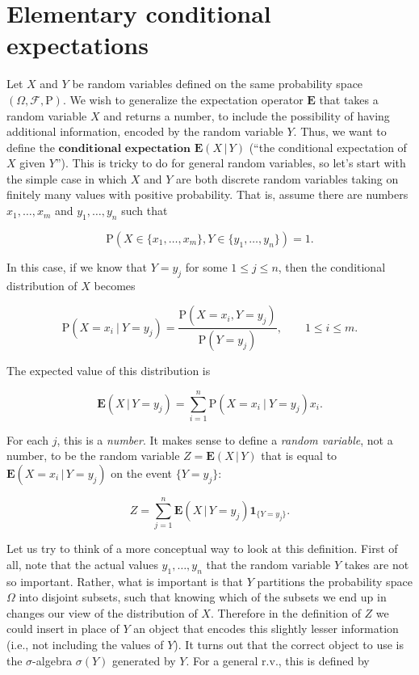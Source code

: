 \documentclass[11pt]{report}
\theoremstyle{plain}
\theoremstyle{definition}
\begin{document}
\section{Elementary conditional expectations}
Let $X$ and $Y$ be random variables defined on the same probability space $(\Omega, \mathcal{F}, \mathrm{P})$. We wish to generalize the expectation operator $\mathbf{E}$ that takes a random variable $X$ and returns a number, to include the possibility of having additional information, encoded by the random variable $Y$. Thus, we want to define the $\textbf{conditional expectation}$ $\mathbf{E}\left(X\,|\,Y\right)$ (``the conditional expectation of $X$ given $Y$''). This is tricky to do for general random variables, so let's start with the simple case in which $X$ and $Y$ are both discrete random variables taking on finitely many values with positive probability. That is, assume there are numbers $x_1,\ldots, x_m$ and $y_1,\ldots, y_n$ such that

\[
\mathrm{P}\left( X \in \{ x_1,\ldots, x_m\}, Y \in \{ y_1,\ldots, y_n \} \right) = 1.
\]

In this case, if we know that $Y=y_j$ for some $1\le j\le n$, then the conditional distribution of $X$ becomes

\[
\mathrm{P}(X = x_i\ |\ Y=y_j) = \frac{\mathrm{P}(X=x_i, Y=y_j)}{\mathrm{P}(Y=y_j)}, \qquad 1\le i\le m.
\]

The expected value of this distribution is

\[
\mathbf{E}\left(X\,|\,Y=y_j\right) = \sum_{i=1}^n \mathrm{P}(X = x_i\ |\ Y=y_j) x_i.
\]

For each $j$, this is a \emph{number}. It makes sense to define a \emph{random variable}, not a number, to be the random variable $Z=\mathbf{E}\left(X\,|\,Y\right)$ that is equal to $\mathbf{E}\left(X=x_i\,|\,Y=y_j\right)$ on the event $\{Y=y_j\}$:

\[
Z = \sum_{j=1}^n \mathbf{E}\left(X\,|\,Y=y_j\right) \mathbf{1}_{\{Y=y_j\}}.
\]

Let us try to think of a more conceptual way to look at this definition. First of all, note that the actual values $y_1,\ldots, y_n$ that the random variable $Y$ takes are not so important. Rather, what is important is that $Y$ partitions the probability space $\Omega$ into disjoint subsets, such that knowing which of the subsets we end up in changes our view of the distribution of $X$. Therefore in the definition of $Z$ we could insert in place of $Y$ an object that encodes this slightly lesser information (i.e., not including the values of $Y$). It turns out that the correct object to use is the $\sigma$-algebra $\sigma(Y)$ generated by $Y$. For a general r.v., this is defined by
\end{document}
